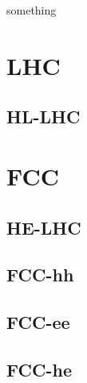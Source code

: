 
something
\section{LHC}
\subsection{HL-LHC}
\section{FCC}
\subsection{HE-LHC}
\subsection{FCC-hh}
\subsection{FCC-ee}
\subsection{FCC-he}
